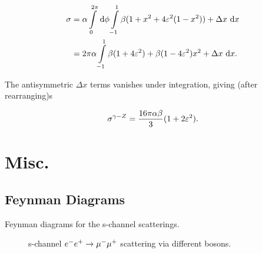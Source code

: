 \documentclass[]{report}
\begin{document}
\begin{align*}
\sigma &= \alpha \int\limits_{0}^{2\pi}\d{\phi}
	\int\limits_{-1}^{1}
		\beta(1+x^{2}+4\varepsilon^{2}(1- x^{2}))
    	+ \Delta x
	\d{x}
\\
&= 2\pi\alpha \int\limits_{-1}^{1} \beta(1+4\varepsilon^{2})+\beta(1-4\varepsilon^{2})x^{2} + \Delta x \d{x}.
\end{align*}

The antisymmetric $\Delta x$ terms vanishes under integration, giving (after rearranging)s

$$
\sigma^{\gamma-\Zzero} = \frac{16\pi\alpha\beta}{3}(1 + 2\varepsilon^{2}).
$$

\chapter{Misc.}

\section{Feynman Diagrams}

Feynman diagrams for the s-channel scatterings.

\begin{figure}[h]
	\vspace{10pt}
	\centering
	\qquad
	\caption{s-channel $e^{-}e^{+}\rarrow\mu^{-}\mu^{+}$ scattering via different bosons.}
\end{figure}
\end{document}
